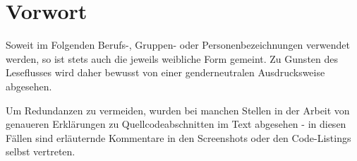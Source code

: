 \documentclass[
	12pt,
	BCOR=10mm,1
	headinclude=on,
	footinclude=off,
	parskip=half,
	bibliography=totoc,
	listof=entryprefix,
	toc=listof, 
	pointlessnumbers,
	plainfootsepline]{scrreprt}
\begin{document}


\normalfont


\chapter*{Vorwort}
Soweit im Folgenden Berufs-, Gruppen- oder Personenbezeichnungen verwendet werden, so ist stets auch die jeweils weibliche Form gemeint. Zu Gunsten des Leseflusses wird daher bewusst von einer genderneutralen Ausdrucksweise abgesehen.
\par
Um Redundanzen zu vermeiden, wurden bei manchen Stellen in der Arbeit von genaueren Erklärungen zu Quellcodeabschnitten im Text abgesehen - in diesen Fällen sind erläuternde Kommentare in den Screenshots oder den Code-Listings selbst vertreten.


\tableofcontents





%

\clearpage 
\ihead{\chaptername~\thechapter} %



\ihead{} %
\printbibliography	

\appendix
\ihead{\appendixname~\thechapter} %




\end{document}
